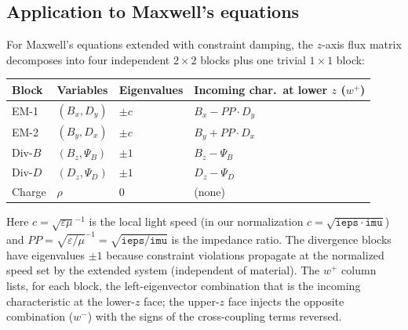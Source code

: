 \documentclass[11pt]{article}
\newcommand{\eps}{\varepsilon}
\begin{document}
\subsection{Application to Maxwell's equations}

For Maxwell's equations extended with constraint damping, the $z$-axis
flux matrix decomposes into four independent $2 \times 2$ blocks plus
one trivial $1 \times 1$ block:

\begin{center}
\begin{tabular}{llll}
\toprule
Block & Variables & Eigenvalues & Incoming char.\ at lower $z$ ($w^+$) \\
\midrule
EM-1         & $(B_x, D_y)$     & $\pm c$ & $B_x - PP \cdot D_y$ \\
EM-2         & $(B_y, D_x)$     & $\pm c$ & $B_y + PP \cdot D_x$ \\
Div-$B$      & $(B_z, \Psi_B)$  & $\pm 1$ & $B_z - \Psi_B$ \\
Div-$D$      & $(D_z, \Psi_D)$  & $\pm 1$ & $D_z - \Psi_D$ \\
Charge       & $\rho$           & $0$     & (none) \\
\bottomrule
\end{tabular}
\end{center}

Here $c = \sqrt{\eps \mu}^{-1}$ is the local light speed (in our
normalization $c = \sqrt{\mathtt{ieps} \cdot \mathtt{imu}}$) and
$PP = \sqrt{\eps/\mu}^{-1} = \sqrt{\mathtt{ieps}/\mathtt{imu}}$ is the
impedance ratio. The divergence blocks have eigenvalues $\pm 1$ because
constraint violations propagate at the normalized speed set by the
extended system (independent of material). The $w^+$ column lists, for
each block, the left-eigenvector combination that is the incoming
characteristic at the lower-$z$ face; the upper-$z$ face injects the
opposite combination ($w^-$) with the signs of the cross-coupling
terms reversed.
\end{document}

